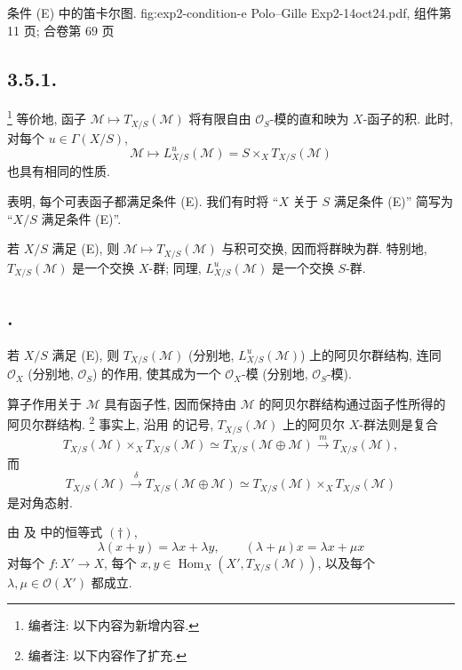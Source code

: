   {条件 (E) 中的笛卡尔图.}
  {fig:exp2-condition-e}
  {Polo--Gille Exp2-14oct24.pdf, 组件第 11 页; 合卷第 69 页}

\subsection*{3.5.1.}
\footnote{编者注: 以下内容为新增内容.}
等价地, 函子 \(\mathcal M\mapsto T_{X/S}(\mathcal M)\)
将有限自由 \(\mathcal O_S\)-模的直和映为 \(X\)-函子的积.
此时, 对每个 \(u\in\Gamma(X/S)\),
\[
  \mathcal M\longmapsto L^u_{X/S}(\mathcal M)
  =S\times_XT_{X/S}(\mathcal M)
\]
也具有相同的性质.

 表明,
每个可表函子都满足条件 (E).
我们有时将 ``\(X\) 关于 \(S\) 满足条件 (E)'' 简写为
``\(X/S\) 满足条件 (E)''.

若 \(X/S\) 满足 (E), 则
\(\mathcal M\mapsto T_{X/S}(\mathcal M)\) 与积可交换,
因而将群映为群. 特别地, \(T_{X/S}(\mathcal M)\) 是一个交换
\(X\)-群; 同理, \(L^u_{X/S}(\mathcal M)\) 是一个交换 \(S\)-群.

\subsection*{.}
若 \(X/S\) 满足 (E), 则 \(T_{X/S}(\mathcal M)\)
(分别地, \(L^u_{X/S}(\mathcal M)\)) 上的阿贝尔群结构,
连同 \(\mathcal O_X\) (分别地, \(\mathcal O_S\)) 的作用,
使其成为一个 \(\mathcal O_X\)-模 (分别地, \(\mathcal O_S\)-模).

算子作用关于 \(\mathcal M\) 具有函子性,
因而保持由 \(\mathcal M\) 的阿贝尔群结构通过函子性所得的阿贝尔群结构.
\footnote{编者注: 以下内容作了扩充.}
事实上, 沿用  的记号,
\(T_{X/S}(\mathcal M)\) 上的阿贝尔 \(X\)-群法则是复合
\[
  T_{X/S}(\mathcal M)\times_XT_{X/S}(\mathcal M)
  \simeq T_{X/S}(\mathcal M\oplus\mathcal M)
  \xrightarrow{\ m\ }T_{X/S}(\mathcal M),
\]
而
\[
  T_{X/S}(\mathcal M)\xrightarrow{\ \delta\ }
  T_{X/S}(\mathcal M\oplus\mathcal M)
  \simeq T_{X/S}(\mathcal M)\times_XT_{X/S}(\mathcal M)
\]
是对角态射.

由 及
 中的恒等式 \((\dagger)\),
\[
  \lambda(x+y)=\lambda x+\lambda y,
  \qquad
  (\lambda+\mu)x=\lambda x+\mu x
\]
对每个 \(f:X'\to X\), 每个
\(x,y\in\operatorname{Hom}_X(X',T_{X/S}(\mathcal M))\),
以及每个 \(\lambda,\mu\in\mathcal O(X')\) 都成立.

